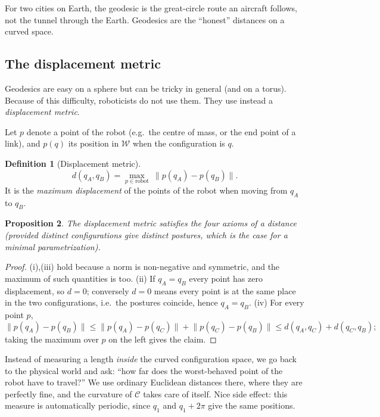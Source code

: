 \documentclass[11pt,a4paper]{article}
\newcommand{\W}{\mathcal{W}}
\newcommand{\C}{\mathcal{C}}
\newcommand{\norm}[1]{\lVert #1\rVert}
\theoremstyle{definition}
\newtheorem{definition}{Definition}[section]
\theoremstyle{plain}
\newtheorem{proposition}[definition]{Proposition}
\begin{document}
\begin{intuition}
For two cities on Earth, the geodesic is the great-circle route an aircraft follows, not the tunnel through the Earth. Geodesics are the ``honest'' distances on a curved space.
\end{intuition}

\subsection{The displacement metric}

Geodesics are easy on a sphere but can be tricky in general (and on a torus). Because of this difficulty, roboticists do not use them. They use instead a \emph{displacement metric}.

Let $p$ denote a point of the robot (e.g.\ the centre of mass, or the end point of a link), and $p(q)$ its position in $\W$ when the configuration is $q$.

\begin{definition}[Displacement metric]
\[
  d(q_A,q_B)=\max_{p\in\text{robot}}\ \norm{p(q_A)-p(q_B)} .
\]
It is the \emph{maximum displacement} of the points of the robot when moving from $q_A$ to $q_B$.
\end{definition}

\begin{proposition}
The displacement metric satisfies the four axioms of a distance (provided distinct configurations give distinct postures, which is the case for a minimal parametrization).
\end{proposition}

\begin{proof}
(i),(iii) hold because a norm is non-negative and symmetric, and the maximum of such quantities is too. (ii) If $q_A=q_B$ every point has zero displacement, so $d=0$; conversely $d=0$ means every point is at the same place in the two configurations, i.e.\ the postures coincide, hence $q_A=q_B$. (iv) For every point $p$,
\[
 \norm{p(q_A)-p(q_B)}\le\norm{p(q_A)-p(q_C)}+\norm{p(q_C)-p(q_B)}\le d(q_A,q_C)+d(q_C,q_B);
\]
taking the maximum over $p$ on the left gives the claim. \qedhere
\end{proof}

\begin{intuition}
Instead of measuring a length \emph{inside} the curved configuration space, we go back to the physical world and ask: ``how far does the worst-behaved point of the robot have to travel?'' We use ordinary Euclidean distances there, where they are perfectly fine, and the curvature of $\C$ takes care of itself. Nice side effect: this measure is automatically periodic, since $q_1$ and $q_1+2\pi$ give the same positions.
\end{intuition}
\end{document}
